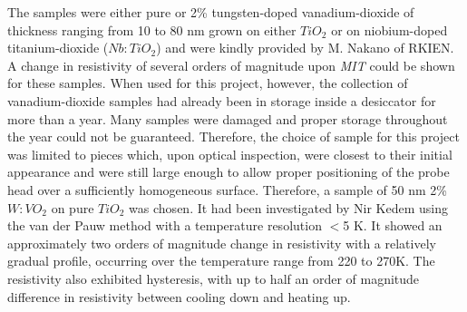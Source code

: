 The samples were either pure or 2\% tungsten-doped vanadium-dioxide of thickness ranging from 10 to 80 nm grown on either $TiO_2$ or on niobium-doped titanium-dioxide ($Nb:TiO_2$) and were kindly provided by M. Nakano of RKIEN. A change in resistivity of several orders of magnitude upon \emph{MIT} could be shown for these samples. When used for this project, however, the collection of vanadium-dioxide samples had already been in storage inside a desiccator for more than a year. Many samples were damaged and proper storage throughout the year could not be guaranteed. Therefore, the choice of sample for this project was limited to pieces which, upon optical inspection, were closest to their initial appearance and were still large enough to allow proper positioning of the probe head over a sufficiently homogeneous surface. Therefore, a sample of 50 nm 2\% $W:VO_2$ on pure $TiO_2$ was chosen. It had been investigated by Nir Kedem using the van der Pauw method with a temperature resolution $<$5 K. It showed an approximately two orders of magnitude change in resistivity with a relatively gradual profile, occurring over the temperature range from 220 to 270K. The resistivity also exhibited hysteresis, with up to half an order of magnitude difference in resistivity between cooling down and heating up.
